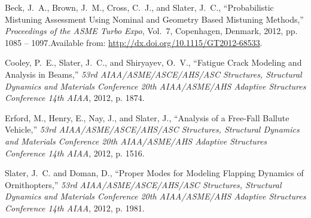 Beck, J.~A., Brown, J.~M., Cross, C.~J., and Slater, J.~C.,  ``Probabilistic Mistuning Assessment Using Nominal and Geometry Based  Mistuning Methods,'' \emph{ Proceedings of the ASME Turbo Expo\/}, Vol.~7,  Copenhagen, Denmark, 2012, pp. 1085 -- 1097.\newblock Available from: \url{http://dx.doi.org/10.1115/GT2012-68533}.

Cooley, P.~E., Slater, J.~C., and Shiryayev, O.~V., ``Fatigue Crack  Modeling and Analysis in Beams,'' \emph{ 53rd AIAA/ASME/ASCE/AHS/ASC Structures,  Structural Dynamics and Materials Conference 20th AIAA/ASME/AHS Adaptive  Structures Conference 14th AIAA\/}, 2012, p. 1874.

Erford, M., Henry, E., Nay, J., and Slater, J., ``Analysis of a  Free-Fall Ballute Vehicle,'' \emph{ 53rd AIAA/ASME/ASCE/AHS/ASC Structures,  Structural Dynamics and Materials Conference 20th AIAA/ASME/AHS Adaptive  Structures Conference 14th AIAA\/}, 2012, p. 1516.

Slater, J.~C. and Doman, D., ``Proper Modes for Modeling Flapping  Dynamics of Ornithopters,'' \emph{ 53rd AIAA/ASME/ASCE/AHS/ASC Structures,  Structural Dynamics and Materials Conference 20th AIAA/ASME/AHS Adaptive  Structures Conference 14th AIAA\/}, 2012, p. 1981.

